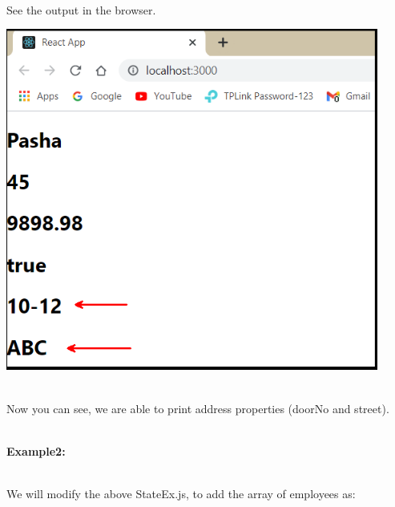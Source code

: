 \documentclass{article}
\begin{document}
\noindent 
\newpage
\noindent \\
See the output in the browser.

\begin{center}
	\noindent \includegraphics*[width=4.82in, height=4.43in]{IMG-09-10}
\end{center}

\noindent 

\noindent 

\noindent \\
Now you can see, we are able to print address properties (doorNo and street).


\newpage
\noindent \\
\textbf{Example2:}

\noindent \\
We will modify the above StateEx.js, to add the array of employees as:
\end{document}
